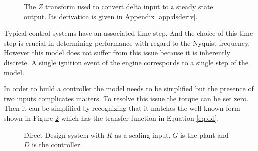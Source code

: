\documentclass{article}
\begin{document}
\begin{figure}[!htbp]

\begin{center}
\end{center}

\caption{The $Z$ transform used to convert delta input to a steady
state output.
Its derivation is given in Appendix \ref{app:dsderiv}.}
\label{fig:dstf}

\end{figure}

Typical control systems have an associated time step.
And the choice of this time step is crucial in determining performance
with regard to the Nyquist frequency.
However this model does not suffer from this issue because it is
inherently discrete.
A single ignition event of the engine corresponds to a single
step of the model.


In order to build a controller the model needs to be simplified
but the presence of two inputs complicates matters.
To resolve this issue the torque can be set zero.
Then it can be simplified by recognizing that it matches
the well known form shown in Figure \ref{fig:dd} which
has the transfer function in Equation \ref{eq:dd}.

\begin{figure}[h!]

\begin{center}
\end{center}

\caption{Direct Design system with $K$ as a scaling input, $G$ is
the plant and $D$ is the controller.}
\label{fig:dd}
\end{figure}
\end{document}
